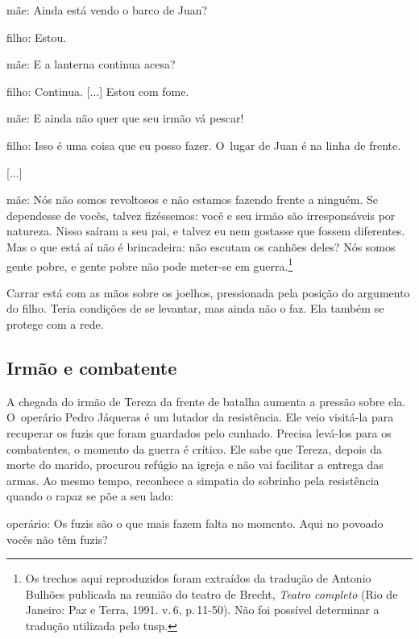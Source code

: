 \startblockquote
{\sc mãe}: Ainda está vendo o barco de Juan?

{\sc filho}: Estou.

{\sc mãe}: E a lanterna continua acesa?

{\sc filho}: Continua. {[}...{]} Estou com fome.

{\sc mãe}: E ainda não quer que seu irmão vá pescar!

{\sc filho}: Isso é uma coisa que eu posso fazer. O~lugar de Juan é na linha
de frente.

{[}...{]}

{\sc mãe}: Nós não somos revoltosos e não estamos fazendo frente a ninguém.
Se dependesse de vocês, talvez fizéssemos: você e seu irmão são
irresponsáveis por natureza. Nisso saíram a seu pai, e talvez eu nem
gostasse que fossem diferentes. Mas o que está aí não é brincadeira: não
escutam os canhões deles? Nós somos gente pobre, e gente pobre não pode
meter-se em guerra.\footnote{Os trechos aqui reproduzidos foram
  extraídos da tradução de Antonio Bulhões publicada na reunião do
  teatro de Brecht, {\it Teatro completo} (Rio de Janeiro: Paz e Terra,
  1991. v.\,6, p.\,11-50). Não foi possível determinar a tradução
  utilizada pelo {\sc tusp}.}
\stopblockquote

Carrar está com as mãos sobre os joelhos, pressionada pela posição do
argumento do filho. Teria condições de se levantar, mas ainda não o faz.
Ela também se protege com a rede.


\subsection{Irmão e combatente}

A chegada do irmão de Tereza da frente de batalha aumenta a pressão
sobre ela. O~operário Pedro Jáqueras é um lutador da resistência. Ele
veio visitá-la para recuperar os fuzis que foram guardados pelo cunhado.
Precisa levá-los para os combatentes, o momento da guerra é crítico. Ele
sabe que Tereza, depois da morte do marido, procurou refúgio na igreja e
não vai facilitar a entrega das armas. Ao mesmo tempo, reconhece a
simpatia do sobrinho pela resistência quando o rapaz se põe a seu lado:

\startblockquote
{\sc operário}: Os fuzis são o que mais fazem falta no momento. Aqui no
povoado vocês não têm fuzis?

